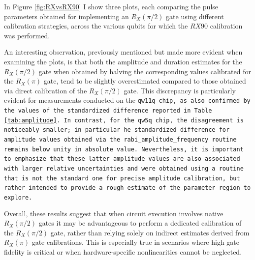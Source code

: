 In Figure \ref{fig:RXvsRX90} I show three plots, each comparing the pulse parameters obtained for implementing an $R_X(\pi/2)$ gate using different calibration strategies, across the various qubits for which the $RX90$ calibration was performed.

An interesting observation, previously mentioned but made more evident when examining the plots, is that both the amplitude and duration estimates for the $R_X(\pi/2)$ gate when obtained by halving the corresponding values calibrated for the $R_X(\pi)$ gate, tend to be slightly overestimated compared to those obtained via direct calibration of the $R_X(\pi/2)$ gate.
This discrepancy is particularly evident for measurements conducted on the \tt{qw11q} chip, as also confirmed by the values of the standardized difference reported in Table \ref{tab:amplitude}.
In contrast, for the \tt{qw5q} chip, the disagreement is noticeably smaller; in particular he standardized difference for amplitude values obtained via the \tt{rabi\_amplitude\_frequency} routine remains below unity in absolute value.
Nevertheless, it is important to emphasize that these latter amplitude values are also associated with larger relative uncertainties and were obtained using a routine that is not the standard one for precise amplitude calibration, but rather intended to provide a rough estimate of the parameter region to explore.

Overall, these results suggest that when circuit execution involves native $R_X(\pi/2)$ gates it may be advantageous to perform a dedicated calibration of the $R_X(\pi/2)$ gate, rather than relying solely on indirect estimates derived from $R_X(\pi)$ gate calibrations. 
This is especially true in scenarios where high gate fidelity is critical or when hardware-specific nonlinearities cannot be neglected.

